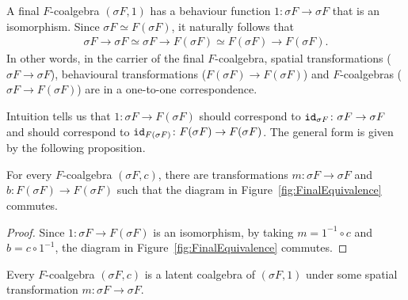 A final $F$-coalgebra $(\sigma F, 1)$ has a behaviour function $1\colon \sigma F \rightarrow \sigma F$ that is an isomorphism. Since $\sigma F \simeq F(\sigma F)$, it naturally follows that 
\begin{align}
    \sigma F\rightarrow \sigma F \simeq \sigma F\rightarrow F(\sigma F) \simeq F(\sigma F)\rightarrow F(\sigma F).    
\end{align}
In other words, in the carrier of the final $F$-coalgebra, spatial transformations ($\sigma F\rightarrow \sigma F$), behavioural transformations ($F(\sigma F)\rightarrow F(\sigma F)$) and $F$-coalgebras ($\sigma F\rightarrow F(\sigma F)$) are in a one-to-one correspondence. 

Intuition tells us that $1\colon \sigma F \rightarrow F(\sigma F)$ should correspond to ${\texttt{id}}_{\sigma F}\colon \sigma F\rightarrow \sigma F$ and should correspond to ${\texttt{id}}_{F(\sigma F)}\colon F(\sigma F)\rightarrow F(\sigma F)$. The general form is given by the following proposition.
\begin{proposition}
    For every $F$-coalgebra $(\sigma F, c)$, there are transformations $m\colon \sigma F\rightarrow \sigma F$ and $b\colon F(\sigma F)\rightarrow F(\sigma F)$ such that the diagram in Figure~\ref{fig:FinalEquivalence} commutes.
\end{proposition}
\begin{proof}
    Since $1\colon \sigma F\rightarrow F(\sigma F)$ is an isomorphism, by taking $m=1^{-1}\circ c$ and $b=c\circ 1^{-1}$, the diagram in Figure~\ref{fig:FinalEquivalence} commutes.
\end{proof}
\begin{corollary}
    Every $F$-coalgebra $(\sigma F, c)$ is a latent coalgebra of $(\sigma F, 1)$ under some spatial transformation $m\colon \sigma F\rightarrow \sigma F$.
\end{corollary}

